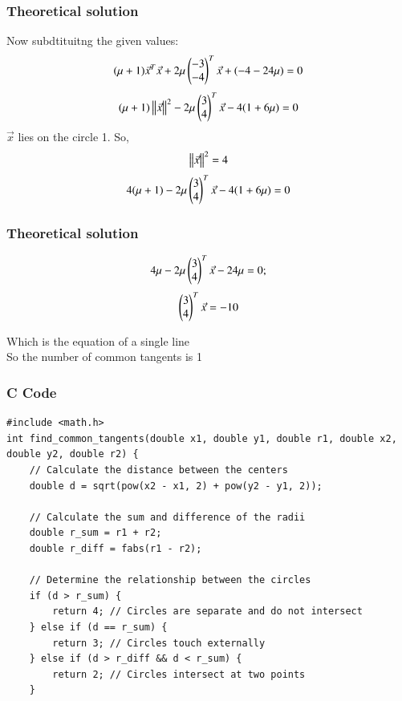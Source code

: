 \documentclass{beamer}
\begin{document}
    \begin{frame}
    \frametitle{Theoretical solution}
 Now subdtituitng the given values:
\begin{align}
    (\mu +1)\Vec{x}^T\Vec{x}+2\mu\begin{pmatrix}-3\\-4\end{pmatrix}^T\Vec{x}+(-4-24\mu)=0
\end{align}
\begin{align}
    (\mu+1)\left\lVert\Vec{x}\right\rVert^2-2\mu\begin{pmatrix}3\\4\end{pmatrix}^T\Vec{x}-4(1+6\mu)=0
\end{align}
$\Vec{x}$ lies on the circle 1. So,
\begin{align}
    \left\lVert\Vec{x}\right\rVert^2=4
\end{align}
\begin{align}
    4(\mu +1)-2\mu\begin{pmatrix}3\\4\end{pmatrix}^T\Vec{x}-4(1+6\mu)=0
\end{align}




    \end{frame}

     \begin{frame}
    \frametitle{Theoretical solution}
\begin{align}
    4\mu-2\mu\begin{pmatrix}3\\4\end{pmatrix}^T\Vec{x}-24\mu=0;
\end{align}
\begin{align}
    \begin{pmatrix}3\\4\end{pmatrix}^T\Vec{x}=-10
    \end{align}

Which is the equation of a single line\\
So the number of common tangents is 1



    \end{frame}
    
    
    
   
    \begin{frame}[fragile]
        \frametitle{C Code}
        \begin{lstlisting}
#include <math.h>
int find_common_tangents(double x1, double y1, double r1, double x2, double y2, double r2) {
    // Calculate the distance between the centers
    double d = sqrt(pow(x2 - x1, 2) + pow(y2 - y1, 2));

    // Calculate the sum and difference of the radii
    double r_sum = r1 + r2;
    double r_diff = fabs(r1 - r2);

    // Determine the relationship between the circles
    if (d > r_sum) {
        return 4; // Circles are separate and do not intersect
    } else if (d == r_sum) {
        return 3; // Circles touch externally
    } else if (d > r_diff && d < r_sum) {
        return 2; // Circles intersect at two points
    } 

        \end{lstlisting}
    \end{frame}
    
\end{document}
